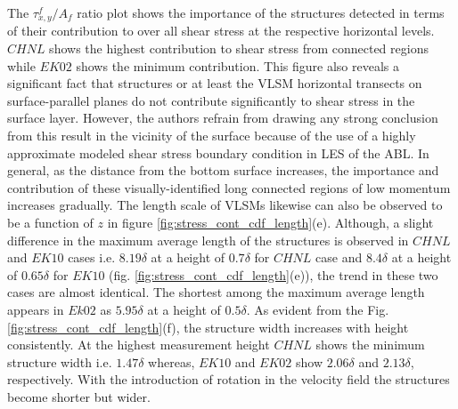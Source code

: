\documentclass{amsart}
\begin{document}
The $\tau_{x,y}^f/A_f$ ratio plot shows the importance of the structures detected in terms of their contribution to over all shear stress at the respective horizontal levels.  $CHNL$  shows the highest  contribution to shear stress from  connected regions  while $EK02$ shows  the minimum contribution.  This figure also reveals a significant fact that structures or at least the VLSM horizontal transects on surface-parallel planes  do not contribute significantly to shear stress in the surface layer.  However, the authors refrain from drawing any strong conclusion from this result in the vicinity of the surface because of the use of a highly approximate modeled shear stress boundary condition in LES of the ABL.  In general, as the distance from the bottom surface increases, the importance and contribution of these visually-identified long connected regions of low momentum increases gradually. The length scale of VLSMs likewise can also be observed to be a function of $z$ in figure \ref{fig:stress_cont_cdf_length}(e). Although, a slight difference in the maximum average  length of the structures is observed in $CHNL$ and $EK10$ cases i.e. $8.19\delta$ at a height of $0.7\delta$ for $CHNL$ case and $8.4\delta$ at a height of $0.65\delta$ for $EK10$ (fig. \ref{fig:stress_cont_cdf_length}(e)), the trend in these two cases are almost identical. The shortest among the maximum average length appears in $Ek02$  as $5.95\delta$ at a height of $0.5\delta$.  As evident from the Fig. \ref{fig:stress_cont_cdf_length}(f), the structure width increases with height consistently.  At the highest measurement height $CHNL$  shows the minimum structure width i.e. $1.47\delta$ whereas, $EK10$ and $EK02$  show $2.06\delta$ and $2.13\delta$, respectively. With the introduction of rotation in the velocity field the structures become shorter but wider. 
\end{document}
